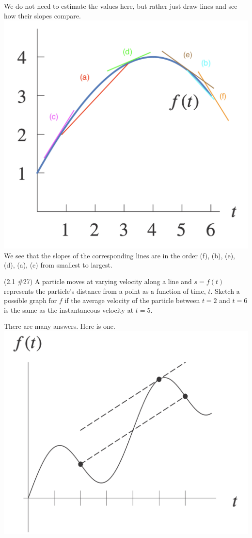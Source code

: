 \documentclass[11pt]{exam}
\begin{document}
\begin{questions}
  \begin{solution}
    We do not need to estimate the values here, but rather just draw
    lines and see how their slopes compare.\\
    \includegraphics[scale=0.5]{no24graph_with_lines.png}\\
    We see that the slopes of the corresponding lines are in the order
    (f), (b), (e), (d), (a), (c) from smallest to largest.
 \end{solution}
  \question (2.1 \#27)
  A particle moves at varying velocity along a line and \(s=f(t)\)
  represents the particle's distance from a point as a function of
  time, \(t\). Sketch a possible graph for \(f\) if the average
  velocity of the particle between \(t=2\) and \(t=6\) is the same as
  the instantaneous velocity at \(t=5\).
  \begin{solution}
    There are many answers. Here is one.\\
    \includegraphics[scale=0.4]{no27answer.png}

\end{solution}
\end{questions}
\end{document}
